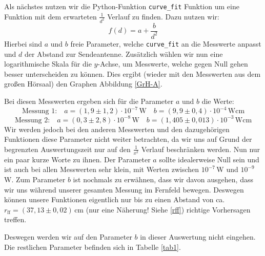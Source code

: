 \documentclass[titlepage,11pt,a4paper,ngerman]{article}
\newcommand{\tx}[1]{\textrm{#1}}
\begin{document}

\noindent
Als nächstes nutzen wir die Python-Funktion \verb|curve_fit| \cite{curvescipy} Funktion um eine Funktion mit dem erwarteten $\frac{1}{d^{2}}$ Verlauf zu finden. Dazu nutzen wir:
\begin{equation}
f(d) = a + \frac{b}{d^{2}}
\label{f}
\end{equation}	
Hierbei sind $a$ und $b$ freie Parameter, welche \verb|curve_fit| an die Messwerte anpasst und $d$ der Abstand zur Sendeantenne. Zusätzlich wählen wir nun eine logarithmische Skala für die $y$-Achse, um Messwerte, welche gegen Null gehen besser unterscheiden zu können. Dies ergibt (wieder mit den Messwerten aus dem großen Hörsaal) den Graphen Abbildung \ref{GrH-A}.\par
Bei diesen Messwerten ergeben sich für die Parameter $a$ und $b$ die Werte:
\begin{equation*}
\tx{Messung 1:} \quad a = (1{,}9\pm1{,}2)\cdot10^{-7}\,\tx{W} \quad b = (9{,}9\pm0{,}4)\cdot10^{-4}\,\tx{Wcm}
\end{equation*}
\begin{equation*}
\tx{Messung 2:} \quad a = (0{,}3\pm2{,}8)\cdot10^{-8}\,\tx{W} \quad b = (1{,405\pm0{,}013})\cdot10^{-3} \,\tx{Wcm}
\end{equation*}
Wir werden jedoch bei den anderen Messwerten und den dazugehörigen Funktionen diese Parameter nicht weiter betrachten, da wir uns auf Grund der begrenzten Auswertungszeit nur auf den $\frac{1}{x^{2}}$ Verlauf beschränken werden. Nun nur ein paar kurze Worte zu ihnen. Der Parameter $a$ sollte idealerweise Null sein und ist auch bei allen Messwerten sehr klein, mit Werten zwischen $10^{-7}\,$W und $10^{-9}\,$W. Zum Parameter $b$ ist nochmals zu erwähnen, dass wir davon ausgehen, dass wir uns während unserer gesamten Messung im Fernfeld bewegen. Deswegen können unsere Funktionen eigentlich nur bis zu einen Abstand von ca. $r_{\tx{ff}}=(37{,}13\pm0{,}02)\,$cm (nur eine Näherung! Siehe \eqref{rff}) richtige Vorhersagen treffen.  \par 
Deswegen werden wir auf den Parameter $b$ in dieser Auswertung nicht eingehen. Die restlichen Parameter befinden sich in Tabelle \ref{tab1}.
\end{document}
